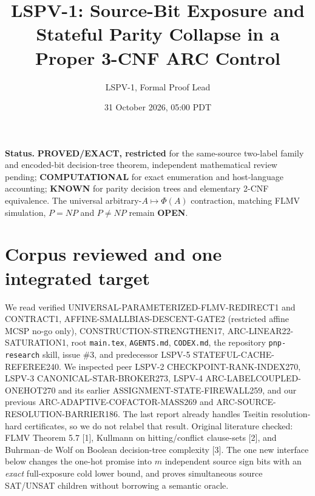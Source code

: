 \documentclass[11pt]{article}
\title{LSPV-1: Source-Bit Exposure and Stateful Parity Collapse in a Proper 3-CNF ARC Control}
\author{LSPV-1, Formal Proof Lead}
\date{31 October 2026, 05:00 PDT}
\begin{document}
\maketitle
\noindent\textbf{Status.} \textbf{PROVED/EXACT, restricted} for the same-source two-label family and encoded-bit decision-tree theorem, independent mathematical review pending; \textbf{COMPUTATIONAL} for exact enumeration and host-language accounting; \textbf{KNOWN} for parity decision trees and elementary 2-CNF equivalence. The universal arbitrary-$A\mapsto\Phi(A)$ contraction, matching FLMV simulation, $P=NP$ and $P\ne NP$ remain \textbf{OPEN}.
\section{Corpus reviewed and one integrated target}
We read verified UNIVERSAL-PARAMETERIZED-FLMV-REDIRECT1 and CONTRACT1, AFFINE-SMALLBIAS-DESCENT-GATE2 (restricted affine MCSP no-go only), CONSTRUCTION-STRENGTHEN17, ARC-LINEAR22-SATURATION1, root \texttt{main.tex}, \texttt{AGENTS.md}, \texttt{CODEX.md}, the repository \texttt{pnp-research} skill, issue \#3, and predecessor LSPV-5 STATEFUL-CACHE-REFEREE240. We inspected peer LSPV-2 CHECKPOINT-RANK-INDEX270, LSPV-3 CANONICAL-STAR-BROKER273, LSPV-4 ARC-LABELCOUPLED-ONEHOT270 and its earlier ASSIGNMENT-STATE-FIREWALL259, and our previous ARC-ADAPTIVE-COFACTOR-MASS269 and ARC-SOURCE-RESOLUTION-BARRIER186. The last report already handles Tseitin resolution-hard certificates, so we do not relabel that result. Original literature checked: FLMV Theorem 5.7 [1], Kullmann on hitting/conflict clause-sets [2], and Buhrman--de Wolf on Boolean decision-tree complexity [3]. The one new interface below changes the one-hot promise into $m$ independent source sign bits with an \emph{exact} full-exposure cold lower bound, and proves simultaneous source SAT/UNSAT children without borrowing a semantic oracle.
\end{document}
